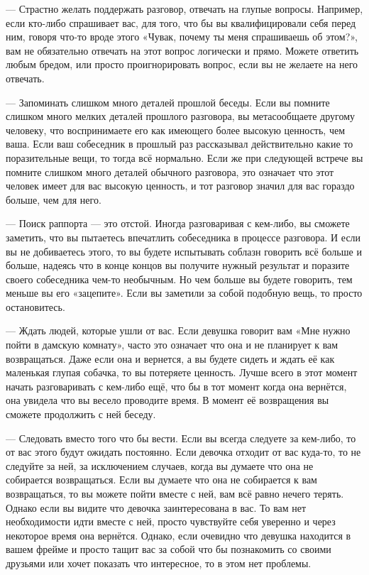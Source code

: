 --- Страстно желать поддержать разговор, отвечать на глупые вопросы. Например, если кто-либо спрашивает вас, для того, что бы вы квалифицировали себя перед ним, говоря что-то вроде этого «Чувак, почему ты меня спрашиваешь об этом?», вам не обязательно отвечать на этот вопрос логически и прямо. Можете ответить любым бредом, или просто проигнорировать вопрос, если вы не желаете на него отвечать.

--- Запоминать слишком много деталей прошлой беседы. Если вы помните слишком много мелких деталей прошлого разговора, вы метасообщаете другому человеку, что воспринимаете его как имеющего более высокую ценность, чем ваша. Если ваш собеседник в прошлый раз рассказывал действительно какие то поразительные вещи, то тогда всё нормально. Если же при следующей встрече вы помните слишком много деталей обычного разговора, это означает что этот человек имеет для вас высокую ценность, и тот разговор значил для вас гораздо больше, чем для него.

--- Поиск раппорта --- это отстой. Иногда разговаривая с кем-либо, вы сможете заметить, что вы пытаетесь впечатлить собеседника в процессе разговора. И если вы не добиваетесь этого, то вы будете испытывать соблазн говорить всё больше и больше, надеясь что в конце концов вы получите нужный результат и поразите своего собеседника чем-то необычным. Но чем больше вы будете говорить, тем меньше вы его «зацепите». Если вы заметили за собой подобную вещь, то просто остановитесь.

--- Ждать людей, которые ушли от вас. Если девушка говорит вам «Мне нужно пойти в дамскую комнату», часто это означает что она и не планирует к вам возвращаться. Даже если она и вернется, а вы будете сидеть и ждать её как маленькая глупая собачка, то вы потеряете ценность. Лучше всего в этот момент начать разговаривать с кем-либо ещё, что бы в тот момент когда она вернётся, она увидела что вы весело проводите время. В момент её возвращения вы сможете продолжить с ней беседу.

--- Следовать вместо того что бы вести. Если вы всегда следуете за кем-либо, то от вас этого будут ожидать постоянно. Если девочка отходит от вас куда-то, то не следуйте за ней, за исключением случаев, когда вы думаете что она не собирается возвращаться. Если вы думаете что она не собирается к вам возвращаться, то вы можете пойти вместе с ней, вам всё равно нечего терять. Однако если вы видите что девочка заинтересована в вас. То вам нет необходимости идти вместе с ней, просто чувствуйте себя уверенно и через некоторое время она вернётся. Однако, если очевидно что девушка находится в вашем фрейме и просто тащит вас за собой что бы познакомить со своими друзьями или хочет показать что интересное, то в этом нет проблемы.

